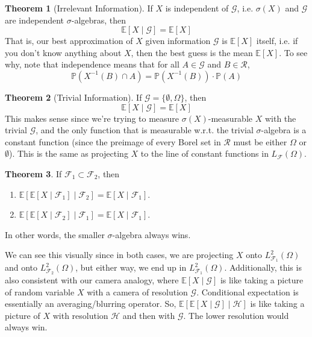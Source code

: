 \documentclass{article}
\theoremstyle{definition}
\newtheorem{theorem}{Theorem}[section]
\theoremstyle{remark}
\theoremstyle{definition}
\begin{document}
\begin{theorem}[Irrelevant Information]
If $X$ is independent of $\mathcal{G}$, i.e. $\sigma(X)$ and $\mathcal{G}$ are independent $\sigma$-algebras, then 
\[\mathbb{E}[X \mid \mathcal{G}] = \mathbb{E}[X]\]
That is, our best approximation of $X$ given information $\mathcal{G}$ is $\mathbb{E}[X]$ itself, i.e. if you don't know anything about $X$, then the best guess is the mean $\mathbb{E}[X]$. To see why, note that independence means that for all $A \in \mathcal{G}$ and $B \in \mathcal{R}$, 
\[\mathbb{P}(X^{-1} (B) \cap A) = \mathbb{P}(X^{-1}(B)) \cdot \mathbb{P}(A)\]
\end{theorem}

\begin{theorem}[Trivial Information]
If $\mathcal{G} = \{\emptyset, \Omega\}$, then 
\[\mathbb{E}[X \mid \mathcal{G}] = \mathbb{E}[X]\]
This makes sense since we're trying to measure $\sigma(X)$-measurable $X$ with the trivial $\mathcal{G}$, and the only function that is measurable w.r.t. the trivial $\sigma$-algebra is a constant function (since the preimage of every Borel set in $\mathcal{R}$ must be either $\Omega$ or $\emptyset$). This is the same as projecting $X$ to the line of constant functions in $L_\mathcal{F}(\Omega)$. 
\end{theorem}

\begin{theorem}
If $\mathcal{F}_1 \subset \mathcal{F}_2$, then 
\begin{enumerate}
    \item $\mathbb{E}[ \mathbb{E}[X \mid \mathcal{F}_1] \mid \mathcal{F}_2] = \mathbb{E}[X \mid \mathcal{F}_1]$. 
    \item $\mathbb{E}[ \mathbb{E}[X \mid \mathcal{F}_2] \mid \mathcal{F}_1] = \mathbb{E}[X \mid \mathcal{F}_1]$. 
\end{enumerate}
In other words, the smaller $\sigma$-algebra always wins. 
\end{theorem}

We can see this visually since in both cases, we are projecting $X$ onto $L^2_{\mathcal{F}_1} (\Omega)$ and onto $L^2_{\mathcal{F}_2} (\Omega)$, but either way, we end up in $L^2_{\mathcal{F}_1} (\Omega)$. Additionally, this is also consistent with our camera analogy, where $\mathbb{E}[X \mid \mathcal{G}]$ is like taking a picture of random variable $X$ with a camera of resolution $\mathcal{G}$. Conditional expectation is essentially an averaging/blurring operator. So, $\mathbb{E}[\mathbb{E}[X \mid \mathcal{G}] \mid \mathcal{H}]$ is like taking a picture of $X$ with resolution $\mathcal{H}$ and then with $\mathcal{G}$. The lower resolution would always win. 
\end{document}
